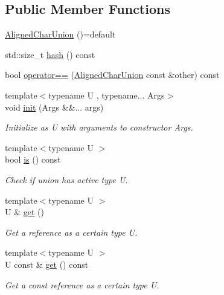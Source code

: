 \subsection*{Public Member Functions}
\begin{DoxyCompactItemize}
\item 
\hyperlink{structvt_1_1util_1_1adt_1_1_aligned_char_union_a8d0afe238f4a44735bb37be847f55c45}{Aligned\+Char\+Union} ()=default
\item 
std\+::size\+\_\+t \hyperlink{structvt_1_1util_1_1adt_1_1_aligned_char_union_a5cdce588713b9d1e65b0be90bbeaa771}{hash} () const
\item 
bool \hyperlink{structvt_1_1util_1_1adt_1_1_aligned_char_union_a30e1323df5870ce0763e90a3d3caa0c9}{operator==} (\hyperlink{structvt_1_1util_1_1adt_1_1_aligned_char_union}{Aligned\+Char\+Union} const \&other) const
\item 
{\footnotesize template$<$typename U , typename... Args$>$ }\\void \hyperlink{structvt_1_1util_1_1adt_1_1_aligned_char_union_a50f97a051cd59537528d6b5879f88a53}{init} (Args \&\&... args)
\begin{DoxyCompactList}\small\item\em Initialize as {\ttfamily U} with arguments to constructor {\ttfamily Args}. \end{DoxyCompactList}\item 
{\footnotesize template$<$typename U $>$ }\\bool \hyperlink{structvt_1_1util_1_1adt_1_1_aligned_char_union_af78cf3c2f5b904d1f49ee19f0ac7871f}{is} () const
\begin{DoxyCompactList}\small\item\em Check if union has active type {\ttfamily U}. \end{DoxyCompactList}\item 
{\footnotesize template$<$typename U $>$ }\\U \& \hyperlink{structvt_1_1util_1_1adt_1_1_aligned_char_union_acd5ebe14c0990b3edacf9aeea031499f}{get} ()
\begin{DoxyCompactList}\small\item\em Get a reference as a certain type {\ttfamily U}. \end{DoxyCompactList}\item 
{\footnotesize template$<$typename U $>$ }\\U const  \& \hyperlink{structvt_1_1util_1_1adt_1_1_aligned_char_union_a4dfd0f51d2c58aa8af33e50e82fe98fa}{get} () const
\begin{DoxyCompactList}\small\item\em Get a const reference as a certain type {\ttfamily U}. \end{DoxyCompactList}\item 

\end{DoxyCompactItemize}
